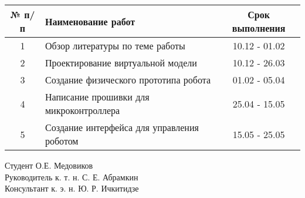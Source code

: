 \begin{tabular}{| c | l | c | }
\hline
№ п/п & Наименование работ & Срок выполнения\\
\hline
1 & Обзор литературы по теме работы & 10.12 - 01.02\\ 
\hline
2 & Проектирование виртуальной модели& 10.12 - 26.03\\
\hline
3 & Создание физического прототипа робота & 01.02 - 05.04\\
\hline
4 & Написание прошивки для микроконтроллера & 25.04 - 15.05 \\
\hline
5 & Создание интерфейса для управления роботом &15.05 - 25.05 \\
\hline
\end{tabular}

\vspace{3cm}

\begin{flushleft}
 \hspace{1cm} Студент \hspace{7cm} \underline{\hspace{3cm}}  О.Е. Медовиков \\ 
 \vspace{5mm}
 \hspace{1cm} Руководитель \hspace{2cm} к. т. н. \hspace{2cm} \underline{\hspace{3cm}}  С. Е. Абрамкин\\ 
 \vspace{5mm}
 \hspace{1cm} Консультант \hspace{2.3cm} к. э. н. \hspace{2cm} \underline{\hspace{3cm}}  Ю. Р. Ичкитидзе\\
\end{flushleft}

\thispagestyle{empty} %

